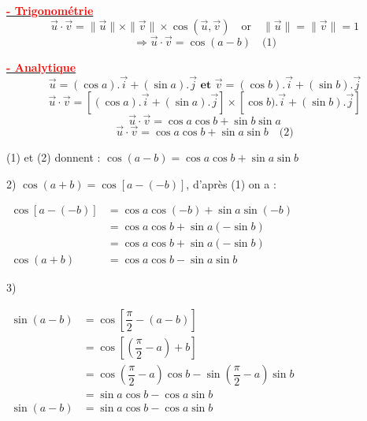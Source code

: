 \documentclass[a4paper,12pt]{article}
\begin{document}
\vspace{1em}
\underline{\textbf{\textcolor{red}{- Trigonométrie}}} \\
\[
    \vec{u} \cdot \vec{v} = \|\vec{u}\| \times \|\vec{v}\| \times \cos(\vec{u}, \vec{v}) \quad \text{or} \quad \|\vec{u}\| = \|\vec{v}\| = 1
\]
\[
    \Rightarrow \vec{u} \cdot \vec{v} = \cos(a - b) \quad \text{(1)}
\]

\vspace{1em}
\underline{\textbf{\textcolor{red}{- Analytique}}} \\
\[
    \vec{u} = (\cos a) .\vec{i} + (\sin a) .\vec{j} \textbf{ et } \vec{v} = (\cos b) .\vec{i} + (\sin b) .\vec{j}
\]
\[
    \vec{u} \cdot \vec{v} = \left[(\cos a) .\vec{i} + (\sin a) .\vec{j}\right] \times \left[\cos b) .\vec{i} + (\sin b) .\vec{j}\right]
\]
\[
    \vec{u} \cdot \vec{v} = \cos a \cos b + \sin b \sin a
\]
\[
    \vec{u} \cdot \vec{v} = \cos a \cos b + \sin a \sin b \quad \text{(2)}
\]

(1) et (2) donnent : \(\cos(a - b) = \cos a \cos b + \sin a \sin b\)

\vspace{1em}
2) \( \cos(a + b) = \cos[a - (-b)] \), d’après (1) on a :

\(
\begin{aligned}
    \cos[a - (-b)] & = \cos a \cos(-b) + \sin a \sin(-b) \\
                   & = \cos a \cos b + \sin a (-\sin b)  \\
                   & = \cos a \cos b + \sin a (-\sin b)  \\
    \cos(a + b)    & = \cos a \cos b - \sin a \sin b
\end{aligned}
\)

\vspace{1em}
3)

\(
\begin{aligned}
    \sin(a - b) & = \cos\left[ \dfrac{\pi}{2} - (a - b) \right]                                               \\
                & = \cos\left[ \left( \dfrac{\pi}{2} - a \right) + b \right]                                  \\
                & = \cos\left( \dfrac{\pi}{2} - a \right)\cos b - \sin\left( \dfrac{\pi}{2} - a \right)\sin b \\
                & = \sin a \cos b - \cos a \sin b                                                             \\
    \sin(a - b) & = \sin a \cos b - \cos a \sin b
\end{aligned}
\)
\end{document}
